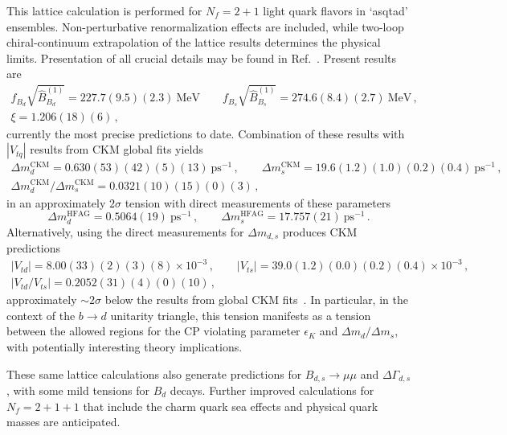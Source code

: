 This lattice calculation is performed for $N_f = 2+1$ light quark flavors in `asqtad' ensembles. Non-perturbative renormalization effects are included, while two-loop chiral-continuum extrapolation of the lattice results determines the physical limits. Presentation of all crucial details may be found in Ref.~\cite{Bazavov:2016nty}. Present results are
\begin{gather}
	f_{B_d}\sqrt{\hat{B}^{(1)}_{B_d}} = 227.7(9.5)(2.3)~\text{MeV} \qquad f_{B_s}\sqrt{\hat{B}^{(1)}_{B_s}} = 274.6(8.4)(2.7)~\text{MeV}\,,\nonumber\\
		\xi = 1.206(18)(6)\,,
\end{gather}
currently the most precise predictions to date. Combination of these results with $|V_{tq}|$ results from CKM global fits yields 
\begin{gather}
	\Delta m^{\text{CKM}}_d = 0.630(53)(42)(5)(13)~\text{ps}^{-1}\,, \qquad \Delta m^{\text{CKM}}_s = 19.6(1.2)(1.0)(0.2)(0.4)~\text{ps}^{-1}\,,\nonumber \\
	\Delta m^{\text{CKM}}_d/\Delta m^{\text{CKM}}_s = 0.0321(10)(15)(0)(3)\,,
\end{gather}
in an approximately $2\sigma$ tension with direct measurements of these parameters \cite{HFAG}
\begin{equation}
	\Delta m^{\text{HFAG}}_d = 0.5064(19)~\text{ps}^{-1}\,,\qquad \Delta m^{\text{HFAG}}_s = 17.757(21)~\text{ps}^{-1}\,.
\end{equation}
Alternatively, using the direct measurements for $\Delta m_{d,s}$ produces CKM predictions
\begin{gather}
	|V_{td}| = 8.00(33)(2)(3)(8)\times 10^{-3}\,,\qquad |V_{ts}| = 39.0(1.2)(0.0)(0.2)(0.4)\times 10^{-3}\,,\nonumber\\
	|V_{td}/V_{ts}| = 0.2052(31)(4)(0)(10)\,,
\end{gather}
approximately $\sim2\sigma$ below the results from global CKM fits~\cite{Charles:2004jd, Charles:2015gya}. In particular, in the context of the $b \to d$ unitarity triangle, this tension manifests as a tension between the allowed regions for the CP violating parameter $\epsilon_K$ and $\Delta m_{d}/\Delta m_s$, with potentially interesting theory implications. 

These same lattice calculations also generate predictions for $B_{d,s} \to \mu\mu$ and $\Delta\Gamma_{d,s}$, with some mild tensions for $B_d$ decays. Further improved calculations for $N_f = 2 + 1 + 1$ that include the charm quark sea effects and physical quark masses are anticipated.

